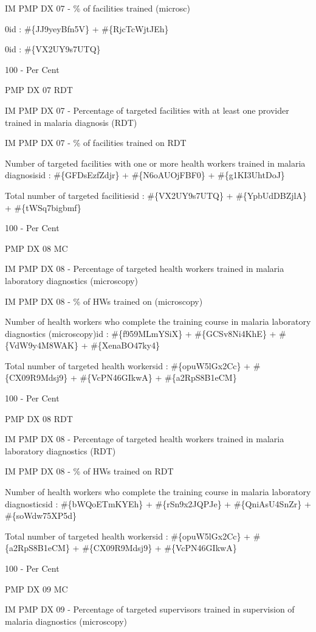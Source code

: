 \documentclass[]{book}
\begin{document}
IM PMP DX 07 - \% of facilities trained (microsc)

0id : \#\{JJ9yeyBfn5V\} + \#\{RjcTcWjtJEh\}

0id : \#\{VX2UY9s7UTQ\}

100 - Per Cent

PMP DX 07 RDT

IM PMP DX 07 - Percentage of targeted facilities with at least one provider trained in malaria diagnosis (RDT)

IM PMP DX 07 - \% of facilities trained on RDT

Number of targeted facilities with one or more health workers trained in malaria diagnosisid : \#\{GFDsEzfZdjr\} + \#\{N6oAUOjFBF0\} + \#\{g1KI3UhtDoJ\}

Total number of targeted facilitiesid : \#\{VX2UY9s7UTQ\} + \#\{YpbUdDBZjlA\} + \#\{tWSq7bigbmf\}

100 - Per Cent

PMP DX 08 MC

IM PMP DX 08 - Percentage of targeted health workers trained in malaria laboratory diagnostics (microscopy)

IM PMP DX 08 - \% of HWs trained on (microscopy)

Number of health workers who complete the training course in malaria laboratory diagnostics (microscopy)id : \#\{f959MLmYSiX\} + \#\{GCSv8Ni4KhE\} + \#\{VdW9y4M8WAK\} + \#\{XenaBO47ky4\}

Total number of targeted health workersid : \#\{opuW5lGx2Cc\} + \#\{CX09R9Mdsj9\} + \#\{VcPN46GIkwA\} + \#\{a2RpS8B1eCM\}

100 - Per Cent

PMP DX 08 RDT

IM PMP DX 08 - Percentage of targeted health workers trained in malaria laboratory diagnostics (RDT)

IM PMP DX 08 - \% of HWs trained on RDT

Number of health workers who complete the training course in malaria laboratory diagnosticsid : \#\{bWQoETmKYEh\} + \#\{rSn9x2JQPJe\} + \#\{QniAsU4SnZr\} + \#\{soWdw75XP5d\}

Total number of targeted health workersid : \#\{opuW5lGx2Cc\} + \#\{a2RpS8B1eCM\} + \#\{CX09R9Mdsj9\} + \#\{VcPN46GIkwA\}

100 - Per Cent

PMP DX 09 MC

IM PMP DX 09 - Percentage of targeted supervisors trained in supervision of malaria diagnostics (microscopy)
\end{document}
